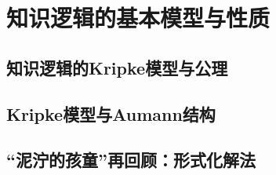 \section{知识逻辑的基本模型与性质}\label{sec:epistemic-logic-basic-model}

\subsection{知识逻辑的Kripke模型与公理}

\subsection{Kripke模型与Aumann结构}

\subsection{“泥泞的孩童”再回顾：形式化解法}


